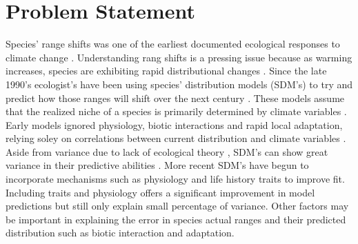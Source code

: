 \documentclass[pdftex,11pt,a4paper]{article}\usepackage{graphicx, color}
\begin{document}
\pagebreak[4]

\section*{Problem Statement}
Species' range shifts was one of the earliest documented ecological responses to climate change \citep{Parmesan1996,Parmesan1999,Parmesan2003}.  Understanding rang shifts is a pressing issue because as warming increases, species are exhibiting rapid distributional changes \citep{Chen2011}. Since the late 1990's ecologist's have been using species' distribution models (SDM's) to try and predict how those ranges will shift over the next century \citep{Davis1998,Iverson1998,Guisan2000,Peterson2001}. These models assume that the realized niche of a species is primarily determined by climate variables \citep{Austin2002,Dormann2007}.   Early models ignored physiology,  biotic interactions and rapid local adaptation, relying soley on correlations between current distribution and climate variables \citep{Davis1998,Pearson2003,Guisan2005,Helmuth2005}.  Aside from variance due to lack of ecological theory \citep{Elith2009}, SDM's can show great variance in their predictive abilities \citep{Elith2006,Kearney2009,Elith2010}.  More recent SDM's have begun to incorporate mechanisms such as physiology \citep{Crozier2006,Buckley2010,Buckley2011} and  life history traits \citep{Midgley2006,Kearney2009,Poyry2009,Angert2011a} to improve fit. Including traits and physiology offers a significant improvement in model predictions \citep{Angert2011a,Buckley2011} but still only explain small percentage of variance.  Other factors may be important in explaining the error in species actual ranges and their predicted distribution such as biotic interaction and adaptation. \\ 
\end{document}
